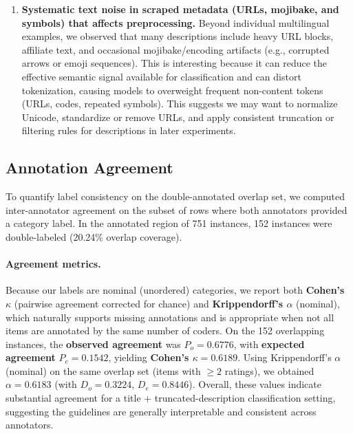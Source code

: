 \documentclass[11pt]{article}
\begin{document}
\begin{enumerate}
  \item \textbf{Systematic text noise in scraped metadata (URLs, mojibake, and symbols) that affects preprocessing.}
  Beyond individual multilingual examples, we observed that many descriptions include heavy URL blocks, affiliate text, and occasional mojibake/encoding artifacts (e.g., corrupted arrows or emoji sequences). This is interesting because it can reduce the effective semantic signal available for classification and can distort tokenization, causing models to overweight frequent non-content tokens (URLs, codes, repeated symbols). This suggests we may want to normalize Unicode, standardize or remove URLs, and apply consistent truncation or filtering rules for descriptions in later experiments.
\end{enumerate}

\subsection{Annotation Agreement}

To quantify label consistency on the double-annotated overlap set, we computed inter-annotator agreement on the subset of
rows where both annotators provided a category label. In the annotated region of 751 instances, 152 instances were
double-labeled (20.24\% overlap coverage).

\paragraph{Agreement metrics.}
Because our labels are nominal (unordered) categories, we report both \textbf{Cohen's $\kappa$} (pairwise agreement
corrected for chance) and \textbf{Krippendorff's $\alpha$} (nominal), which naturally supports missing annotations and is
appropriate when not all items are annotated by the same number of coders. On the 152 overlapping instances, the
\textbf{observed agreement} was $P_o = 0.6776$, with \textbf{expected agreement} $P_e = 0.1542$, yielding
\textbf{Cohen's $\kappa = 0.6189$}. Using Krippendorff's $\alpha$ (nominal) on the same overlap set (items with $\ge 2$
ratings), we obtained \textbf{$\alpha = 0.6183$} (with $D_o = 0.3224$, $D_e = 0.8446$). Overall, these values indicate
substantial agreement for a title + truncated-description classification setting, suggesting the guidelines are
generally interpretable and consistent across annotators.
\end{document}

